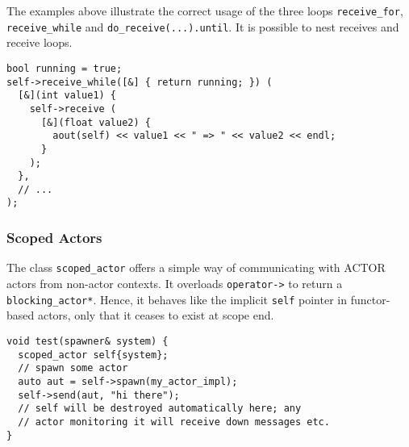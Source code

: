 The examples above illustrate the correct usage of the three loops
\lstinline^receive_for^, \lstinline^receive_while^ and
\lstinline^do_receive(...).until^. It is possible to nest receives and receive
loops.

\begin{lstlisting}
bool running = true;
self->receive_while([&] { return running; }) (
  [&](int value1) {
    self->receive (
      [&](float value2) {
        aout(self) << value1 << " => " << value2 << endl;
      }
    );
  },
  // ...
);
\end{lstlisting}

\subsubsection{Scoped Actors}
\label{scoped-actors}

The class \lstinline^scoped_actor^ offers a simple way of communicating with
ACTOR actors from non-actor contexts. It overloads \lstinline^operator->^ to
return a \lstinline^blocking_actor*^. Hence, it behaves like the implicit
\lstinline^self^ pointer in functor-based actors, only that it ceases to exist
at scope end.

\begin{lstlisting}
void test(spawner& system) {
  scoped_actor self{system};
  // spawn some actor
  auto aut = self->spawn(my_actor_impl);
  self->send(aut, "hi there");
  // self will be destroyed automatically here; any
  // actor monitoring it will receive down messages etc.
}
\end{lstlisting}
